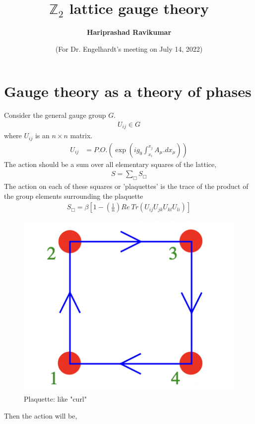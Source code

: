 \documentclass[]{article}
\title{$\mathbb{Z}_2$ lattice gauge theory}
\author{\textbf{Hariprashad Ravikumar}}
\date{(For Dr. Engelhardt's meeting on July 14, 2022)}
\numberwithin{equation}{section}
\begin{document}
	\maketitle


\section{Gauge theory as a theory of phases}
Consider the general gauge group $G$.
\begin{align}
    U_{ij}\in G
\end{align}
where $U_{ij}$ is an $n\times n$ matrix. 
\begin{align}
    U_{ij}&=P.O.\left(\exp{\left(ig_0\int_{x_i}^{x_j}A_{\mu}.dx_{\mu}\right)}\right)
\end{align}
The action should be a
sum over all elementary squares of the lattice,
\begin{align}
    S=\sum_\Box S_\Box
\end{align}
The action on each of these squares or 'plaquettes' is the trace of the product of the group elements surrounding the plaquette
\begin{align}
    S_\Box=\beta\left[1-\left(\frac{1}{n}\right)Re~Tr\left(U_{ij}U_{jk}U_{kl}U_{li}\right)\right]
\end{align}
\begin{figure}  [h!]
	\centering
	\includegraphics[scale=0.4]{Screen Shot 2022-07-13 at 11.21.15 AM.png}
	\caption{Plaquette: like "curl"}
\end{figure}
Then the action will be,
\end{document}
